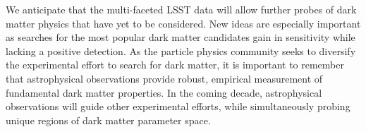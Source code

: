 \documentclass[12pt]{article}
\begin{document}
\noindent We anticipate that the multi-faceted LSST data will allow further probes of dark matter physics that have yet to be considered.
New ideas are especially important as searches for the most popular dark matter candidates gain in sensitivity while lacking a positive detection.
As the particle physics community seeks to diversify the experimental effort to search for dark matter, it is important to remember that astrophysical observations provide robust, empirical measurement of fundamental dark matter properties.
In the coming decade, astrophysical observations will guide other experimental efforts, while simultaneously probing unique regions of dark matter parameter space.

\end{document}
